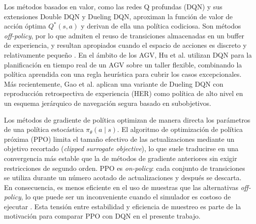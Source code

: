Los métodos basados en valor, como las redes Q profundas (DQN) y
sus extensiones Double DQN y Dueling DQN, aproximan la función de valor de
acción óptima $Q^*(s,a)$ y derivan de ella una política codiciosa. Son
métodos \textit{off-policy}, por lo que admiten el reuso de transiciones
almacenadas en un buffer de experiencia, y resultan apropiados cuando el
espacio de acciones es discreto y relativamente pequeño
\citep{hu2020deep}. En el ámbito de los AGV, Hu et al. \citep{hu2020deep}
utilizan DQN para la planificación en tiempo real de un AGV sobre un taller
flexible, combinando la política aprendida con una regla heurística para
cubrir los casos excepcionales. Más recientemente, Gao et al.
\citep{gao2025hierarchical} aplican una variante de Dueling DQN con
reproducción retrospectiva de experiencia (HER) como política de alto nivel
en un esquema jerárquico de navegación segura basado en subobjetivos.

Los métodos de gradiente de política optimizan de manera directa
los parámetros de una política estocástica $\pi_\theta(a\mid s)$. El
algoritmo de optimización de política próxima (PPO) limita el tamaño
efectivo de las actualizaciones mediante un objetivo recortado
(\textit{clipped surrogate objective}), lo que suele traducirse en una
convergencia más estable que la de métodos de gradiente anteriores sin
exigir restricciones de segundo orden. PPO es \textit{on-policy}: cada
conjunto de transiciones se utiliza durante un número acotado de
actualizaciones y después se descarta. En consecuencia, es menos eficiente
en el uso de muestras que las alternativas \textit{off-policy}, lo que
puede ser un inconveniente cuando el simulador es costoso de ejecutar
\citep{sivashangaran2023deep,ge2024deep}. Esta tensión entre estabilidad y
eficiencia de muestreo es parte de la motivación para comparar PPO con DQN
en el presente trabajo.

